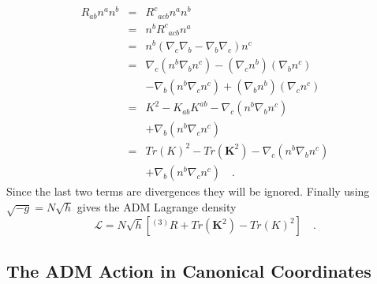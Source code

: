 \documentclass[twocolumn]{article}
\def\.{{\quad .}}
\begin{document}
\begin{eqnarray*}
   R_{ab} n^a n^b & = & {R^c}_{acb} n^a n^b \\
                  & = & n^b {R^c}_{acb}n^a \\
                  & = & n^b \left( \nabla_c \nabla_b - \nabla_b \nabla_c \right) n^c \\
                  & = & \nabla_c(n^b \nabla_b n^c)-(\nabla_c n^b)(\nabla_b n^c) \\
                  &   & - \nabla_b(n^b \nabla_c n^c)+(\nabla_b n^b)(\nabla_c n^c) \\
                  & = & K^2 - K_{ab} K^{ab} -
                          \nabla_c \left( n^b \nabla_b n^c \right) \\
                  &   & + \nabla_b \left( n^b \nabla_c n^c \right)  \\
                  & = & Tr(K)^2 - Tr({\mathbf K}^2) -
                          \nabla_c \left( n^b \nabla_b n^c \right) \\
                  &   & + \nabla_b \left( n^b \nabla_c n^c \right)  \.
\end{eqnarray*}
Since the last two terms are divergences they will be ignored.  Finally using
$\sqrt{-g} = N \sqrt{h}$ gives the ADM Lagrange density
\begin{equation}\label{eq:Hilbert_L}
   {\mathcal L} = N \sqrt{h} \left[ {}^{(3)}R + Tr({\mathbf K^2}) - Tr(K)^2 \right] \.
\end{equation}


\subsection{The ADM Action in Canonical Coordinates}\label{SS:Can_ADM}
\end{document}
